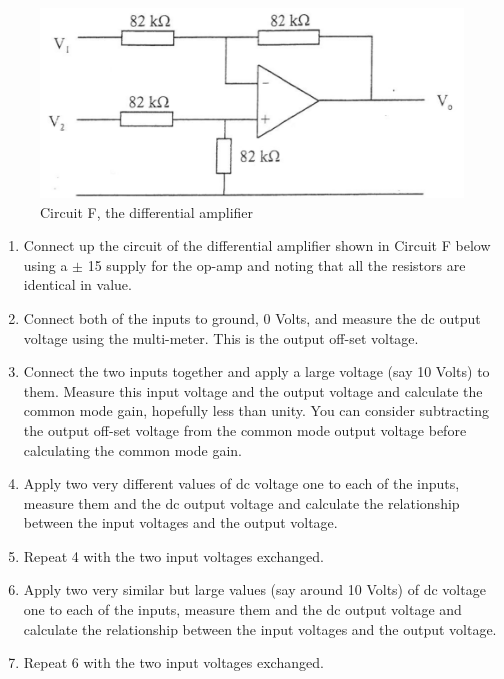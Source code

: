 \begin{figure}[H] %
\begin{center}
\includegraphics[width=1\linewidth]{LabTwo/f}
\end{center}
\caption{Circuit F, the differential amplifier}
\label{fig:2_diffAmp}
\end{figure}

\begin{enumerate}
	\item  Connect up the circuit of the differential amplifier shown in Circuit F below using a $\pm$ 15
supply for the op-amp and noting that all the resistors are identical in value.
\item  Connect both of the inputs to ground, 0 Volts, and measure the dc output voltage using the
multi-meter. This is the output off-set voltage.

\item  Connect the two inputs together and apply a large voltage (say 10 Volts) to them. Measure
this input voltage and the output voltage and calculate the common mode gain, hopefully
less than unity. You can consider subtracting the output off-set voltage from the common
mode output voltage before calculating the common mode gain.

\item Apply two very different values of dc voltage one to each of the inputs, measure them and
the dc output voltage and calculate the relationship between the input voltages and the
output voltage.

\item  Repeat 4 with the two input voltages exchanged.

\item  Apply two very similar but large values (say around 10 Volts) of dc voltage one to each of
the inputs, measure them and the dc output voltage and calculate the relationship between
the input voltages and the output voltage.

\item  Repeat 6 with the two input voltages exchanged.
\end{enumerate}

